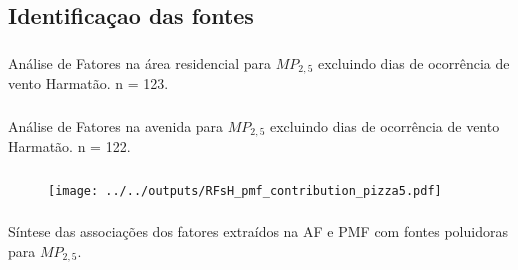 \subsection{Identificaçao das fontes}



\begin{frame}
  \frametitle{}
  Análise de Fatores na área residencial para $MP_{2,5}$
               excluindo dias de ocorrência de vento Harmatão. n = 123.          
  \begin{table}[H]
    \centering
    \tiny
    
  \end{table}
\end{frame}

\begin{frame}
  \frametitle{}
Análise de Fatores na avenida para $MP_{2,5}$
           excluindo dias de ocorrência de vento Harmatão. n = 122.         
  \begin{table}[H]
    \centering
    \tiny
    
  \end{table}
\end{frame}



\begin{frame}
  \frametitle{}
    \begin{figure}
      \centering
            \begin{minipage}[b]{0.4\linewidth}
              \tiny
              
      
            \end{minipage}
                  \hspace{3cm}
      \begin{minipage}[b]{0.3\linewidth}
        \texttt{[image: ../../outputs/RFsH\_pmf\_contribution\_pizza5.pdf]}

      \end{minipage}%


    \end{figure}
\end{frame}


\begin{frame}
  \frametitle{}
  Síntese das associações dos fatores extraídos na AF e PMF com fontes 
  poluidoras para $MP_{2,5}$.
  \begin{table}[H]
    \centering
    \tiny
    
  \end{table}
  
    \begin{table}[H]
    	\centering
    	\tiny
    	
    \end{table}
\end{frame}


